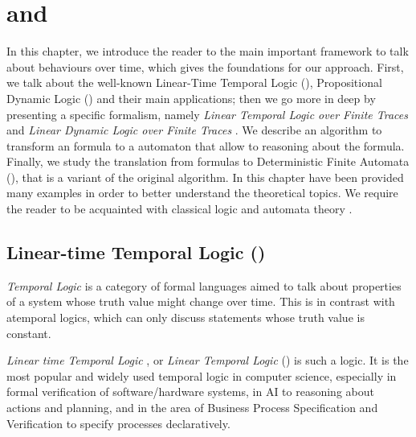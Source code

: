 \chapter{\LTLf and \LDLf}
\label{ch:logic}

In this chapter, we introduce the reader to the main important framework to talk about behaviours over time, which gives the foundations for our approach.
First, we talk about the well-known Linear-Time Temporal Logic (\LTL), Propositional Dynamic Logic (\PDL) and their main applications; then we go more in deep by presenting a specific formalism, namely \emph{Linear Temporal Logic over Finite Traces} \LTLf and \emph{Linear Dynamic Logic over Finite Traces} \LDLf. We describe an algorithm to transform an \LLf formula to a \NFA automaton that allow to reasoning about the formula.
Finally, we study the translation from \LLf formulas to Deterministic Finite Automata (\DFA), that is a variant of the original algorithm. 
In this chapter have been provided many examples in order to better understand the theoretical topics.
We require the reader to be acquainted with classical logic \citep{sep-logic-classical} and automata theory \citep{Hopcroft:2000:IAT:557657}.
\section{Linear-time Temporal Logic (\LTL)}\label{sect:ltl}
\emph{Temporal Logic} \citep{sep-logic-temporal} is a category of formal languages aimed to talk about properties of a system whose truth value might change over time. This is in contrast with atemporal logics, which can only discuss statements whose truth value is constant. 

\emph{Linear time Temporal Logic} \citep{Pnueli:1977:TLP:1382431.1382534}, or \emph{Linear Temporal Logic} (\LTL) is such a logic. It is the most popular and widely used temporal logic in computer science, especially in formal verification of software/hardware systems, in AI to reasoning about actions and planning, and in the area of Business Process Specification and Verification to specify processes declaratively.

